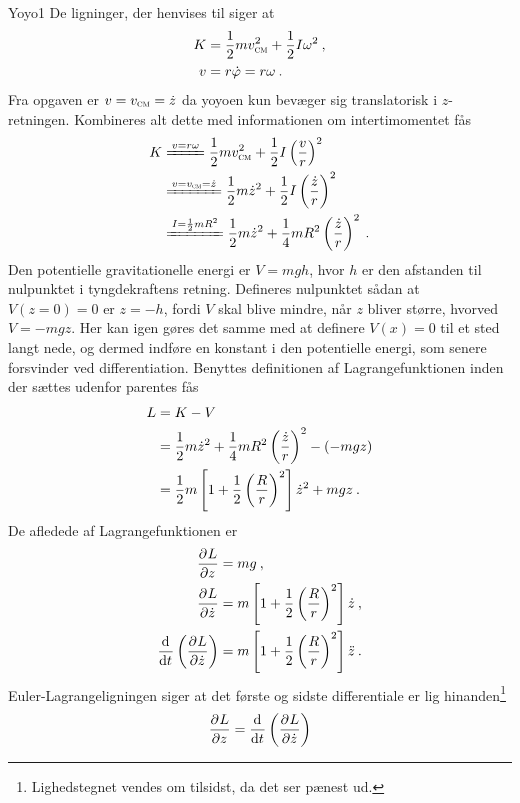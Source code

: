%
%
\begin{opgave}{Yoyo}{1}
De ligninger, der henvises til siger at
\begin{align*}
	K &= \frac{1}{2}mv_\textsc{cm}^2 + \frac{1}{2}I\omega^2 \: , \\
	v &= r\dt{\phi} = r\omega \: .
\end{align*}
\opg Fra opgaven er $v = v_\textsc{cm} = \dt{z}$  da yoyoen kun bevæger sig translatorisk i $z$-retningen. Kombineres alt dette med informationen om intertimomentet fås
\begin{align*}
	K &\xleq{v=r\omega} \frac{1}{2}mv_\textsc{cm}^2 + \frac{1}{2}I\left(\frac{v}{r}\right)^2 \\
	&\xleq{v=v_\textsc{cm}=\dt{z}} \frac{1}{2}m\dt{z}^2 + \frac{1}{2}I\left(\frac{\dt{z}}{r}\right)^2 \\
	&\xleq{I = \frac{1}{2}mR^2} \frac{1}{2}m\dt{z}^2 + \frac{1}{4}mR^2\left(\frac{\dt{z}}{r}\right)^2 \: .
\end{align*}
\opg Den potentielle gravitationelle energi er $V = mgh$, hvor $h$ er den afstanden til nulpunktet i tyngdekraftens retning. Defineres nulpunktet sådan at $V(z=0)=0$ er $z=-h$, fordi $V$ skal blive mindre, når $z$ bliver større, hvorved $V = -mgz$. Her kan igen gøres det samme med at definere $V(x) = 0$ til et sted langt nede, og dermed indføre en konstant i den potentielle energi, som senere forsvinder ved differentiation.
\opg Benyttes definitionen af Lagrangefunktionen inden der sættes udenfor parentes fås
\begin{align*}
	L &= K - V \\
	&= \frac{1}{2}m\dt{z}^2 + \frac{1}{4}mR^2\left(\frac{\dt{z}}{r}\right)^2 - (-mgz) \\
	&= \frac{1}{2}m\left[1 + \frac{1}{2}\left(\frac{R}{r}\right)^2\right]\dt{z}^2 + mgz \: .
\end{align*}
\opg De afledede af Lagrangefunktionen er
\begin{align*}
	\pdif{z}{L} &= mg \: ,\\
	\pdif{\dt{z}}{L} &= m\left[1 + \frac{1}{2}\left(\frac{R}{r}\right)^2\right]\dt{z} \: , \\
	\el{\dt{z}} &= m\left[1 + \frac{1}{2}\left(\frac{R}{r}\right)^2\right]\ddt{z} \: .
\end{align*}
\opg Euler-Lagrangeligningen siger at det første og sidste differentiale er lig hinanden\footnote{Lighedstegnet vendes om tilsidst, da det ser pænest ud.}
\begin{align*}
	\pdif{z}{L} &= \el{\dt{z}}\\

\end{align*}
\end{opgave}
